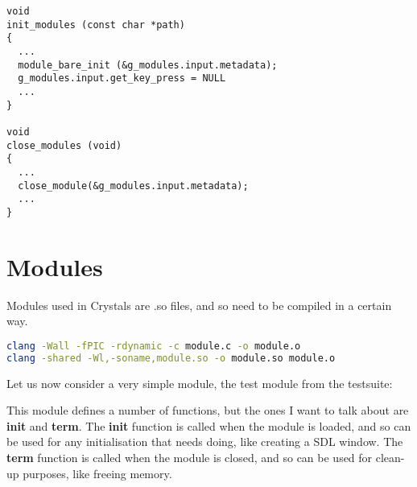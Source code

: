 \documentclass[12pt,a4paper]{article}
\begin{document}
\begin{lstlisting}
void
init_modules (const char *path)
{
  ...
  module_bare_init (&g_modules.input.metadata);
  g_modules.input.get_key_press = NULL
  ...
}

void
close_modules (void)
{
  ...
  close_module(&g_modules.input.metadata);
  ...
}
\end{lstlisting}

\section{Modules}

Modules used in Crystals are .so files, and so need to be compiled in a certain way.

\begin{lstlisting}[language=bash]
clang -Wall -fPIC -rdynamic -c module.c -o module.o
clang -shared -Wl,-soname,module.so -o module.so module.o
\end{lstlisting}

Let us now consider a very simple module, the test module from the testsuite:



This module defines a number of functions, but the ones I want to talk about are \textbf{init} and \textbf{term}. The \textbf{init} function is called when the module is loaded, and so can be used for any initialisation that needs doing, like creating a SDL window. The \textbf{term} function is called when the module is closed, and so can be used for clean-up purposes, like freeing memory.
\end{document}
